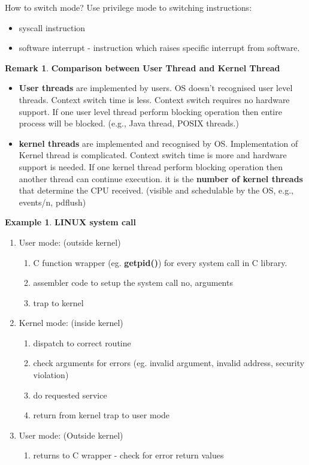 \documentclass[12pt,a4paper]{article}
\theoremstyle{definition}
\newtheorem*{remark}{Remark}
\newtheorem{example}{Example}[section]
\newenvironment{myitemize}
{ \begin{itemize}
    \setlength{\itemsep}{5pt}
    \setlength{\parskip}{0pt}
    \setlength{\parsep}{0pt}     }
{ \end{itemize}                  }
\newenvironment{myenumerate}
{ \begin{enumerate}
    \setlength{\itemsep}{5pt}
    \setlength{\parskip}{0pt}
    \setlength{\parsep}{0pt}     }
{ \end{enumerate}                }
\begin{document}
\begin{tcolorbox}
	\textsf{How to switch mode?} Use privilege mode to switching instructions:
	\begin{myitemize}
		\item syscall instruction
		\item software interrupt - instruction which raises specific interrupt from software.
	\end{myitemize}
\end{tcolorbox}

\begin{remark}{\textbf{Comparison between User Thread and Kernel Thread}}
	\begin{myitemize}
		\item \textbf{User threads} are implemented by users. OS doesn’t recognised user level threads. Context switch time is less. Context switch requires no hardware support. If one user level thread perform blocking operation then entire process will be blocked. (e.g., Java thread, POSIX threads.)
		\item \textbf{kernel threads} are implemented and recognised by OS. Implementation of Kernel thread is complicated. Context switch time is more and hardware support is needed. If one kernel thread perform blocking operation then another thread can continue execution. it is the \textbf{number of kernel threads} that determine the CPU received. (visible and schedulable by the OS, e.g., events/n, pdflush)
	\end{myitemize}
\end{remark}

\begin{example}{\textbf{LINUX system call}}
	\begin{myenumerate}
		\item User mode: (outside kernel)
		\begin{myenumerate}
			\item C function wrapper (eg. \textbf{getpid()}) for every system call in C library.
			\item assembler code to setup the system call no, arguments
			\item trap to kernel	
		\end{myenumerate}
		\item Kernel mode: (inside kernel)
		\begin{myenumerate}
			\item dispatch to correct routine
			\item check arguments for errors (eg. invalid argument, invalid address, security violation)
			\item do requested service
			\item return from kernel trap to user mode
		\end{myenumerate}
		\item User mode: (Outside kernel)
		\begin{myenumerate}
			\item returns to C wrapper - check for error return values
		\end{myenumerate}
	\end{myenumerate}
\end{example}
\end{document}
